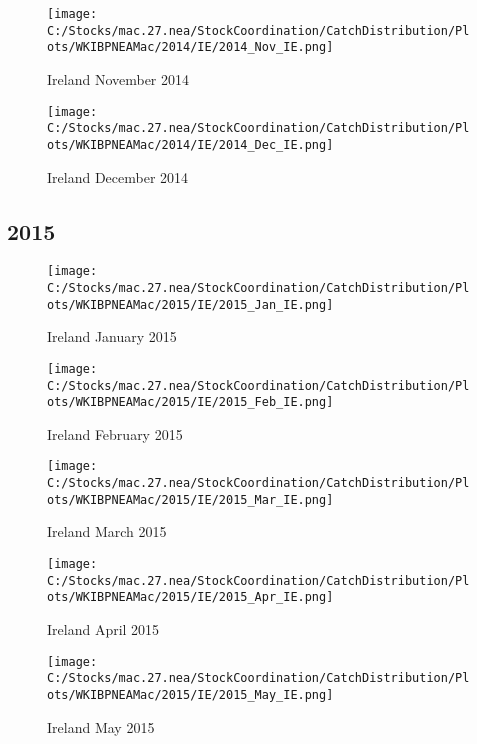 \documentclass{article}
\begin{document}
\begin{figure}
	\centering
		\texttt{[image: C:/Stocks/mac.27.nea/StockCoordination/CatchDistribution/Plots/WKIBPNEAMac/2014/IE/2014\_Nov\_IE.png]}
	\caption{Ireland November 2014}
	\label{fig:2014_Nov_IE}
\end{figure}

\begin{figure}
	\centering
		\texttt{[image: C:/Stocks/mac.27.nea/StockCoordination/CatchDistribution/Plots/WKIBPNEAMac/2014/IE/2014\_Dec\_IE.png]}
	\caption{Ireland December 2014}
	\label{fig:2014_Dec_IE}
\end{figure}

\clearpage

\newpage

\subsection{2015}



\begin{figure}[h]
	\centering
		\texttt{[image: C:/Stocks/mac.27.nea/StockCoordination/CatchDistribution/Plots/WKIBPNEAMac/2015/IE/2015\_Jan\_IE.png]}
	\caption{Ireland January 2015}
	\label{fig:2015_Jan_IE}
\end{figure}

\begin{figure}
	\centering
		\texttt{[image: C:/Stocks/mac.27.nea/StockCoordination/CatchDistribution/Plots/WKIBPNEAMac/2015/IE/2015\_Feb\_IE.png]}
	\caption{Ireland February 2015}
	\label{fig:2015_Feb_IE}
\end{figure}

\begin{figure}
	\centering
		\texttt{[image: C:/Stocks/mac.27.nea/StockCoordination/CatchDistribution/Plots/WKIBPNEAMac/2015/IE/2015\_Mar\_IE.png]}
	\caption{Ireland March 2015}
	\label{fig:2015_Mar_IE}
\end{figure}

\begin{figure}
	\centering
		\texttt{[image: C:/Stocks/mac.27.nea/StockCoordination/CatchDistribution/Plots/WKIBPNEAMac/2015/IE/2015\_Apr\_IE.png]}
	\caption{Ireland April 2015}
	\label{fig:2015_Apr_IE}
\end{figure}

\begin{figure}
	\centering
		\texttt{[image: C:/Stocks/mac.27.nea/StockCoordination/CatchDistribution/Plots/WKIBPNEAMac/2015/IE/2015\_May\_IE.png]}
	\caption{Ireland May 2015}
	\label{fig:2015_May_IE}
\end{figure}
\end{document}
